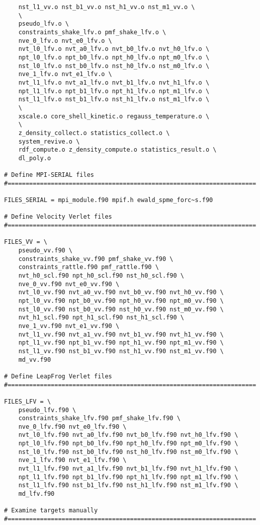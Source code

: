 \begin{verbatim}
	nst_l1_vv.o nst_b1_vv.o nst_h1_vv.o nst_m1_vv.o \
	\
	pseudo_lfv.o \
	constraints_shake_lfv.o pmf_shake_lfv.o \
	nve_0_lfv.o nvt_e0_lfv.o \
	nvt_l0_lfv.o nvt_a0_lfv.o nvt_b0_lfv.o nvt_h0_lfv.o \
	npt_l0_lfv.o npt_b0_lfv.o npt_h0_lfv.o npt_m0_lfv.o \
	nst_l0_lfv.o nst_b0_lfv.o nst_h0_lfv.o nst_m0_lfv.o \
	nve_1_lfv.o nvt_e1_lfv.o \
	nvt_l1_lfv.o nvt_a1_lfv.o nvt_b1_lfv.o nvt_h1_lfv.o \
	npt_l1_lfv.o npt_b1_lfv.o npt_h1_lfv.o npt_m1_lfv.o \
	nst_l1_lfv.o nst_b1_lfv.o nst_h1_lfv.o nst_m1_lfv.o \
	\
	xscale.o core_shell_kinetic.o regauss_temperature.o \
	\
	z_density_collect.o statistics_collect.o \
	system_revive.o \
	rdf_compute.o z_density_compute.o statistics_result.o \
	dl_poly.o

# Define MPI-SERIAL files
#=====================================================================

FILES_SERIAL = mpi_module.f90 mpif.h ewald_spme_forc~s.f90

# Define Velocity Verlet files
#=====================================================================

FILES_VV = \
	pseudo_vv.f90 \
	constraints_shake_vv.f90 pmf_shake_vv.f90 \
	constraints_rattle.f90 pmf_rattle.f90 \
	nvt_h0_scl.f90 npt_h0_scl.f90 nst_h0_scl.f90 \
	nve_0_vv.f90 nvt_e0_vv.f90 \
	nvt_l0_vv.f90 nvt_a0_vv.f90 nvt_b0_vv.f90 nvt_h0_vv.f90 \
	npt_l0_vv.f90 npt_b0_vv.f90 npt_h0_vv.f90 npt_m0_vv.f90 \
	nst_l0_vv.f90 nst_b0_vv.f90 nst_h0_vv.f90 nst_m0_vv.f90 \
	nvt_h1_scl.f90 npt_h1_scl.f90 nst_h1_scl.f90 \
	nve_1_vv.f90 nvt_e1_vv.f90 \
	nvt_l1_vv.f90 nvt_a1_vv.f90 nvt_b1_vv.f90 nvt_h1_vv.f90 \
	npt_l1_vv.f90 npt_b1_vv.f90 npt_h1_vv.f90 npt_m1_vv.f90 \
	nst_l1_vv.f90 nst_b1_vv.f90 nst_h1_vv.f90 nst_m1_vv.f90 \
	md_vv.f90

# Define LeapFrog Verlet files
#=====================================================================

FILES_LFV = \
	pseudo_lfv.f90 \
	constraints_shake_lfv.f90 pmf_shake_lfv.f90 \
	nve_0_lfv.f90 nvt_e0_lfv.f90 \
	nvt_l0_lfv.f90 nvt_a0_lfv.f90 nvt_b0_lfv.f90 nvt_h0_lfv.f90 \
	npt_l0_lfv.f90 npt_b0_lfv.f90 npt_h0_lfv.f90 npt_m0_lfv.f90 \
	nst_l0_lfv.f90 nst_b0_lfv.f90 nst_h0_lfv.f90 nst_m0_lfv.f90 \
	nve_1_lfv.f90 nvt_e1_lfv.f90 \
	nvt_l1_lfv.f90 nvt_a1_lfv.f90 nvt_b1_lfv.f90 nvt_h1_lfv.f90 \
	npt_l1_lfv.f90 npt_b1_lfv.f90 npt_h1_lfv.f90 npt_m1_lfv.f90 \
	nst_l1_lfv.f90 nst_b1_lfv.f90 nst_h1_lfv.f90 nst_m1_lfv.f90 \
	md_lfv.f90

# Examine targets manually
#=====================================================================


\end{verbatim}
